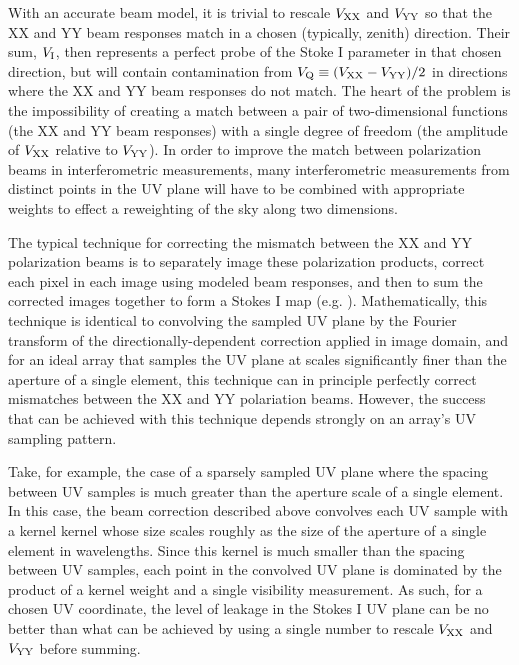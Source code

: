 \documentclass[twocolumn,apj,numberedappendix]{emulateapj}
\begin{document}
With an accurate beam model, it is trivial to rescale ${V_{\rm XX}}$ and ${V_{\rm YY}}$ 
so that the XX and YY beam responses match in a chosen (typically, zenith) direction.  Their sum, ${V_{\rm I}}$, then
represents a perfect probe of the Stoke I parameter in that chosen direction, but will contain contamination
from ${V_{\rm Q}}\equiv({V_{\rm XX}}-{V_{\rm YY}})/2$ in directions where the XX and YY beam responses do not match.
The heart of the problem is the impossibility of creating a match between a pair of two-dimensional functions (the
XX and YY beam responses) with a single degree of freedom (the amplitude of ${V_{\rm XX}}$ relative to ${V_{\rm YY}}$).  In order
to improve the match between polarization beams in interferometric measurements, many interferometric measurements
from distinct points in the UV plane will have to be combined with appropriate weights to effect a reweighting
of the sky along two dimensions.

The typical technique for correcting the mismatch between the XX and YY polarization beams is to separately
image these polarization products, correct each pixel in each image using modeled beam responses,
and then to sum the corrected images together to form a Stokes I map 
(e.g. \citealt{sullivan,lofar,bernardi}).  Mathematically, this technique is identical to convolving the sampled
UV plane by the Fourier transform of the directionally-dependent correction applied in image domain, and for an ideal
array that samples the UV plane at scales significantly finer than the aperture of a single element, this technique can
in principle perfectly correct mismatches between the XX and YY polariation beams.
However, the success that can be achieved with this technique depends strongly on an array's UV sampling pattern.

Take, for example, the case of a sparsely sampled UV plane where the spacing between UV samples is much greater than
the aperture scale of a single element.  In this case, the beam correction described above 
convolves each UV sample with a kernel kernel whose size scales roughly as the size of the aperture of a
single element in wavelengths.  Since this kernel is much smaller than the spacing between UV samples, 
each point in the convolved UV plane is dominated by the product of a kernel weight and a single visibility measurement.
As such, for a chosen UV coordinate, the level of leakage in the Stokes I UV plane can
be no better than what can be achieved by using a single number to rescale ${V_{\rm XX}}$ and ${V_{\rm YY}}$ before summing.  
\end{document}
